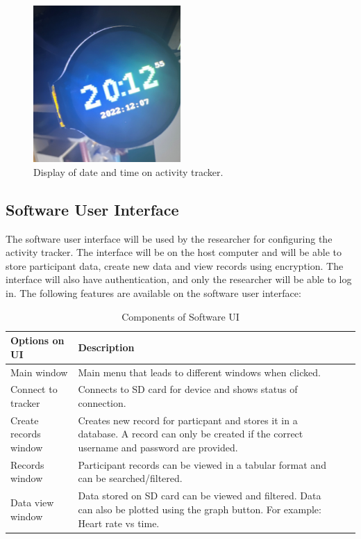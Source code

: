 \documentclass[12pt, titlepage]{article}
\begin{document}
\begin{figure}[H]
	\begin{center}
		 \includegraphics[width=0.5\textwidth]{DisplayTime}
		\caption{Display of date and time on activity tracker.}
		\label{DisplayTime} 
	\end{center}
\end{figure}

\subsection{Software User Interface}

The software user interface will be used by the researcher for configuring the activity tracker. The interface will be on the host computer and will be able to store participant data, create new data and view records using encryption. The interface will also have authentication, and only the researcher will be able to log in. The following features are available on the software user interface:

\begin{table}[H]
	\begin{tabularx}{1.05\textwidth} { 
		  | >{\centering\arraybackslash}X 
		  | >{\centering\arraybackslash}X 
		  | >{\centering\arraybackslash}X 
		  | >{\centering\arraybackslash}X | }
		 \hline
		 \textbf{Options on UI} & \textbf{Description}\\
		 \hline
		Main window & Main menu that leads to different windows when clicked.\\
		\hline
		 Connect to tracker  & Connects to SD card for device and shows status of connection.\\
		 \hline
		   Create records window & Creates new record for particpant and stores it in a database. A record can only be created if the correct username and password are provided. \\
		\hline 
		Records window & Participant records can be viewed in a tabular format and can be searched/filtered.\\
		\hline
		Data view window & Data stored on SD card can be viewed and filtered. Data can also be plotted using the graph button. For example: Heart rate vs time.\\
		\hline
	\end{tabularx}
\caption{\label{Software User Interface}Components of Software UI}  
\end{table}
\end{document}
